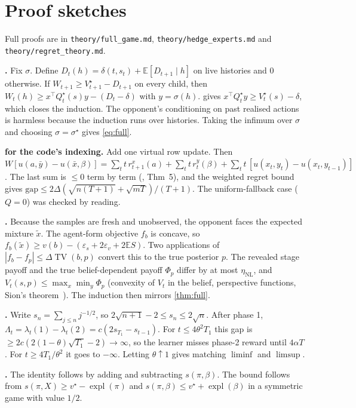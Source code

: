\documentclass[10pt]{article}
\theoremstyle{plain}
\theoremstyle{definition}
\theoremstyle{remark}
\newcommand{\E}{\mathbb{E}}
\newcommand{\epss}{\varepsilon_s}
\newcommand{\epsv}{\varepsilon_v}
\newcommand{\etaNL}{\eta_{\mathrm{NL}}}
\newcommand{\Qstar}{Q^\star}
\newcommand{\Vstar}{V^\star}
\DeclareMathOperator{\expl}{expl}
\DeclareMathOperator{\TV}{TV}
\begin{document}
\appendix
\section{Proof sketches}
\label{app:proofs}
Full proofs are in \texttt{theory/full\_game.md}, \texttt{theory/hedge\_experts.md} and \texttt{theory/regret\_theory.md}.

\textbf{.} Fix $\sigma$. Define $D_t(h)=\delta(t,s_t)+\E[D_{t+1}\mid h]$ on live histories and $0$ otherwise. If $W_{t+1}\ge\Vstar_{t+1}-D_{t+1}$ on every child, then $W_t(h)\ge x^\top\Qstar_t(s)y-(D_t-\delta)$ with $y=\sigma(h)$.  gives $x^\top\Qstar_ty\ge\Vstar_t(s)-\delta$, which closes the induction. The opponent's conditioning on past realised actions is harmless because the induction runs over histories. Taking the infimum over $\sigma$ and choosing $\sigma=\sigma^\star$ gives \eqref{eq:full}.

\textbf{ for the code's indexing.} Add one virtual row update. Then $W[u(a,\bar y)-u(\bar x,\beta)]=\sum_tt\,r^x_{t+1}(a)+\sum_tt\,r^y_t(\beta)+\sum_tt\,[u(x_t,y_t)-u(x_t,y_{t-1})]$. The last sum is $\le0$ term by term (\cite{BMS19}, Thm~5), and the weighted regret bound gives $\mathrm{gap}\le2\Delta(\sqrt{n(T+1)}+\sqrt{mT})/(T+1)$. The uniform-fallback case ($Q=0$) was checked by reading.

\textbf{.} Because the samples are fresh and unobserved, the opponent faces the expected mixture $\tilde x$. The agent-form objective $f_b$ is concave, so $f_b(\tilde x)\ge v(b)-(\epss+2\epsv+2\E S)$. Two applications of $|f_b-f_p|\le\Delta\TV(b,p)$ convert this to the true posterior $p$. The revealed stage payoff and the true belief-dependent payoff $\Phi_p$ differ by at most $\etaNL$, and $V_t(s,p)\le\max_x\min_y\Phi_p$ (convexity of $V_t$ in the belief, perspective functions, Sion's theorem~\cite{Sion58}). The induction then mirrors \cref{thm:full}.

\textbf{.} Write $s_n=\sum_{j\le n}j^{-1/2}$, so $2\sqrt{n+1}-2\le s_n\le2\sqrt n$. After phase 1, $\Lambda_t=\lambda_t(1)-\lambda_t(2)=c(2s_{T_1}-s_{t-1})$. For $t\le4\theta^2T_1$ this gap is $\ge2c(2(1-\theta)\sqrt{T_1}-2)\to\infty$, so the learner misses phase-2 reward until $4\alpha T$. For $t\ge4T_1/\theta^2$ it goes to $-\infty$. Letting $\theta\uparrow1$ gives matching $\liminf$ and $\limsup$.

\textbf{.} The identity follows by adding and subtracting $s(\pi,\beta)$. The bound follows from $s(\pi,X)\ge v^\star-\expl(\pi)$ and $s(\pi,\beta)\le v^\star+\expl(\beta)$ in a symmetric game with value $1/2$.
\end{document}
